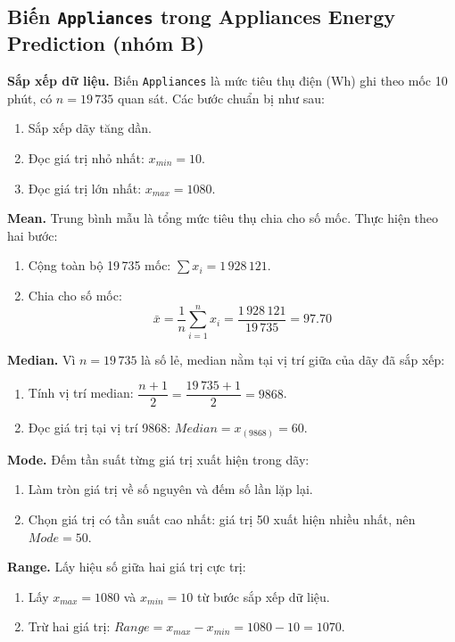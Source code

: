 \FloatBarrier
\subsection{Biến \texttt{Appliances} trong Appliances Energy Prediction (nhóm B)}

\noindent\textbf{Sắp xếp dữ liệu.} Biến \texttt{Appliances} là mức tiêu thụ điện (Wh) ghi theo mốc 10 phút, có $n=19\,735$ quan sát. Các bước chuẩn bị như sau:
\begin{enumerate}[leftmargin=2.2em,label=\textbf{\arabic*.}]
 \item Sắp xếp dãy tăng dần.
 \item Đọc giá trị nhỏ nhất: $x_{min}=10$.
 \item Đọc giá trị lớn nhất: $x_{max}=1080$.
\end{enumerate}

\noindent\textbf{Mean.} Trung bình mẫu là tổng mức tiêu thụ chia cho số mốc. Thực hiện theo hai bước:
\begin{enumerate}[leftmargin=2.2em,label=\textbf{\arabic*.}]
 \item Cộng toàn bộ 19\,735 mốc: $\sum x_i = 1\,928\,121$.
 \item Chia cho số mốc:
 \begin{equation}
 \bar{x} = \frac{1}{n}\sum_{i=1}^{n}x_i = \frac{1\,928\,121}{19\,735} = 97.70
 \end{equation}
\end{enumerate}

\noindent\textbf{Median.} Vì $n=19\,735$ là số lẻ, median nằm tại vị trí giữa của dãy đã sắp xếp:
\begin{enumerate}[leftmargin=2.2em,label=\textbf{\arabic*.}]
 \item Tính vị trí median: $\dfrac{n+1}{2}=\dfrac{19\,735+1}{2}=9868$.
 \item Đọc giá trị tại vị trí 9868: $Median=x_{(9868)}=60$.
\end{enumerate}

\noindent\textbf{Mode.} Đếm tần suất từng giá trị xuất hiện trong dãy:
\begin{enumerate}[leftmargin=2.2em,label=\textbf{\arabic*.}]
 \item Làm tròn giá trị về số nguyên và đếm số lần lặp lại.
 \item Chọn giá trị có tần suất cao nhất: giá trị 50 xuất hiện nhiều nhất, nên $Mode=50$.
\end{enumerate}

\noindent\textbf{Range.} Lấy hiệu số giữa hai giá trị cực trị:
\begin{enumerate}[leftmargin=2.2em,label=\textbf{\arabic*.}]
 \item Lấy $x_{max}=1080$ và $x_{min}=10$ từ bước sắp xếp dữ liệu.
 \item Trừ hai giá trị: $Range = x_{max}-x_{min}=1080-10=1070$.
\end{enumerate}

